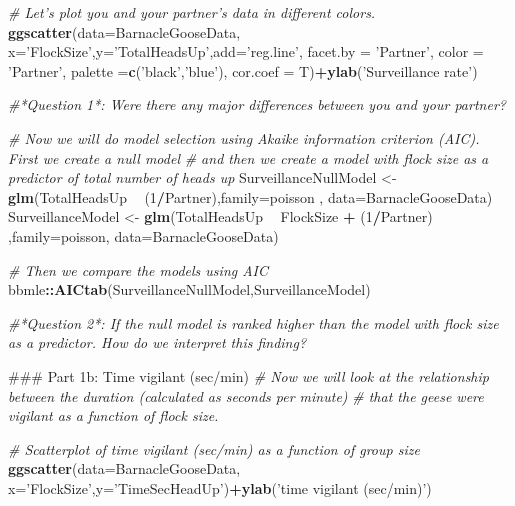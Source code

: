 \documentclass[]{book}
\newenvironment{Shaded}{\begin{snugshade}}{\end{snugshade}}
\newcommand{\CommentTok}[1]{\textcolor[rgb]{0.56,0.35,0.01}{\textit{#1}}}
\newcommand{\DataTypeTok}[1]{\textcolor[rgb]{0.13,0.29,0.53}{#1}}
\newcommand{\DecValTok}[1]{\textcolor[rgb]{0.00,0.00,0.81}{#1}}
\newcommand{\KeywordTok}[1]{\textcolor[rgb]{0.13,0.29,0.53}{\textbf{#1}}}
\newcommand{\NormalTok}[1]{#1}
\newcommand{\OperatorTok}[1]{\textcolor[rgb]{0.81,0.36,0.00}{\textbf{#1}}}
\newcommand{\StringTok}[1]{\textcolor[rgb]{0.31,0.60,0.02}{#1}}
\begin{document}
\begin{Shaded}
\begin{Highlighting}[]
\CommentTok{# Let's plot you and your partner's data in different colors. }
\KeywordTok{ggscatter}\NormalTok{(}\DataTypeTok{data=}\NormalTok{BarnacleGooseData,}
          \DataTypeTok{x=}\StringTok{'FlockSize'}\NormalTok{,}\DataTypeTok{y=}\StringTok{'TotalHeadsUp'}\NormalTok{,}\DataTypeTok{add=}\StringTok{'reg.line'}\NormalTok{, }\DataTypeTok{facet.by =} \StringTok{'Partner'}\NormalTok{,}
          \DataTypeTok{color =} \StringTok{'Partner'}\NormalTok{, }\DataTypeTok{palette =}\KeywordTok{c}\NormalTok{(}\StringTok{'black'}\NormalTok{,}\StringTok{'blue'}\NormalTok{),}
          \DataTypeTok{cor.coef =}\NormalTok{ T)}\OperatorTok{+}\KeywordTok{ylab}\NormalTok{(}\StringTok{'Surveillance rate'}\NormalTok{)}

\CommentTok{#*Question 1*: Were there any major differences between you and your partner?}

\CommentTok{# Now we will do model selection using Akaike information criterion (AIC). First we create a null model}
\CommentTok{# and then we create a model with flock size as a predictor of total number of heads up}
\NormalTok{SurveillanceNullModel <-}\StringTok{ }\KeywordTok{glm}\NormalTok{(TotalHeadsUp }\OperatorTok{~}\StringTok{ }\NormalTok{(}\DecValTok{1}\OperatorTok{/}\NormalTok{Partner),}\DataTypeTok{family=}\NormalTok{poisson , }\DataTypeTok{data=}\NormalTok{BarnacleGooseData)}
\NormalTok{SurveillanceModel <-}\StringTok{ }\KeywordTok{glm}\NormalTok{(TotalHeadsUp }\OperatorTok{~}\StringTok{ }\NormalTok{FlockSize }\OperatorTok{+}\StringTok{ }\NormalTok{(}\DecValTok{1}\OperatorTok{/}\NormalTok{Partner) ,}\DataTypeTok{family=}\NormalTok{poisson, }\DataTypeTok{data=}\NormalTok{BarnacleGooseData)}

\CommentTok{# Then we compare the models using AIC}
\NormalTok{bbmle}\OperatorTok{::}\KeywordTok{AICtab}\NormalTok{(SurveillanceNullModel,SurveillanceModel)}

\CommentTok{#*Question 2*: If the null model is ranked higher than the model with flock size as a predictor. How do we interpret this finding?}

\NormalTok{### Part 1b: Time vigilant (sec/min)}
\CommentTok{# Now we will look at the relationship between the duration (calculated as seconds per minute)}
\CommentTok{# that the geese were vigilant as a function of flock size.}

\CommentTok{# Scatterplot of time vigilant (sec/min) as a function of group size}
\KeywordTok{ggscatter}\NormalTok{(}\DataTypeTok{data=}\NormalTok{BarnacleGooseData,}
          \DataTypeTok{x=}\StringTok{'FlockSize'}\NormalTok{,}\DataTypeTok{y=}\StringTok{'TimeSecHeadUp'}\NormalTok{)}\OperatorTok{+}\KeywordTok{ylab}\NormalTok{(}\StringTok{'time vigilant (sec/min)'}\NormalTok{)}


\end{Highlighting}
\end{Shaded}
\end{document}

